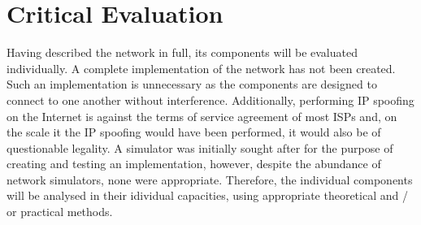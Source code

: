 \documentclass[ %
                    author={Luke Murray},
                supervisor={Dr. Simon Hollis},
                     title={Shadow Peer-to-Peer Networks},
                  subtitle={},
                    degree={MEng},
                      year={2013} ]{thesis}
\begin{document}

\chapter{Critical Evaluation}
\label{chap:evaluation}

Having described the network in full, its components will be evaluated individually. A complete implementation of the network has not been created. Such an implementation is unnecessary as the components are designed to connect to one another without interference. Additionally, performing IP spoofing on the Internet is against the terms of service agreement of most ISPs and, on the scale it the IP spoofing would have been performed, it would also be of questionable legality. A simulator was initially sought after for the purpose of creating and testing an implementation, however, despite the abundance of network simulators, none were appropriate. Therefore, the individual components will be analysed in their idividual capacities, using appropriate theoretical and / or practical methods.
\end{document}
